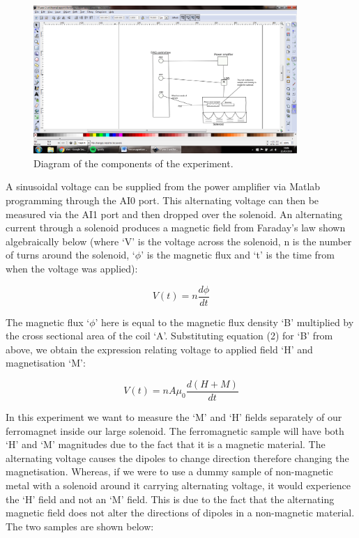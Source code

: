 \documentclass[a4paper]{article}\usepackage[english]{babel}
\begin{document}
\begin{figure}
\includegraphics[trim=450 130 180 150,clip,width=10cm,clip,width=\linewidth]{picture4.png}
\caption{\label{fig:picture4}Diagram of the components of the experiment. }
\end{figure}
\FloatBarrier
A sinusoidal voltage can be supplied from the power amplifier via Matlab programming through the AI0 port. This alternating voltage can then be measured via the AI1 port and then dropped over the solenoid. An alternating current through a solenoid produces a magnetic field from Faraday's law shown algebraically below (where ‘V’ is the voltage across the solenoid, n is the number of turns around the solenoid, ‘$\phi$’ is the magnetic flux and ‘t’ is the time from when the voltage was applied):

\begin{equation}\label{my_third_equation}
V(t)= n\frac{d\phi}{dt}
\end{equation}

The magnetic flux ‘$\phi$’ here is equal to the magnetic flux density ‘B’ multiplied by the cross sectional area of the coil ‘A’. Substituting equation (2) for ‘B’ from above, we obtain the expression relating voltage to applied field ‘H’ and magnetisation ‘M’:

\begin{equation}\label{my_fourth_equation}
V(t)= nA\mu_0\frac{d(H+M)}{dt}
\end{equation}

In this experiment we want to measure the ‘M’ and ‘H’ fields separately of our ferromagnet inside our large solenoid. The ferromagnetic sample will have both ‘H’ and ‘M’ magnitudes due to the fact that it is a magnetic material. The alternating voltage causes the dipoles to change direction therefore changing the magnetisation.
Whereas, if we were to use a dummy sample of non-magnetic metal with a solenoid around it carrying alternating voltage, it would experience the ‘H’ field and not an ‘M’ field. This is due to the fact that the alternating magnetic field does not alter the directions of dipoles in a non-magnetic material.
The two samples are shown below: 
\end{document}
